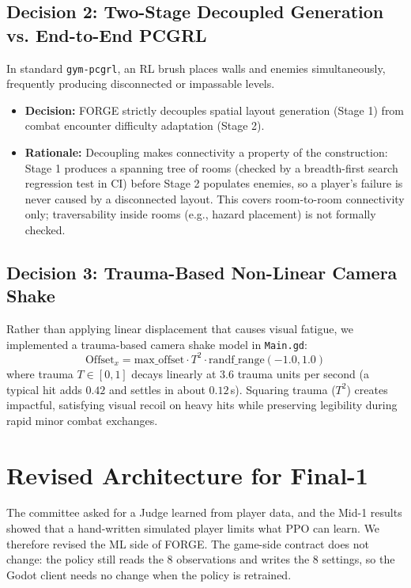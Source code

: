 \subsection{Decision 2: Two-Stage Decoupled Generation vs. End-to-End PCGRL}
In standard \texttt{gym-pcgrl}, an RL brush places walls and enemies simultaneously, frequently producing disconnected or impassable levels.
\begin{itemize}
    \item \textbf{Decision:} FORGE strictly decouples spatial layout generation (Stage 1) from combat encounter difficulty adaptation (Stage 2).
    \item \textbf{Rationale:} Decoupling makes connectivity a property of the construction: Stage 1 produces a spanning tree of rooms (checked by a breadth-first search regression test in CI) before Stage 2 populates enemies, so a player's failure is never caused by a disconnected layout. This covers room-to-room connectivity only; traversability inside rooms (e.g., hazard placement) is not formally checked.
\end{itemize}

\subsection{Decision 3: Trauma-Based Non-Linear Camera Shake}
Rather than applying linear displacement that causes visual fatigue, we implemented a trauma-based camera shake model in \texttt{Main.gd}:
\begin{equation}
\text{Offset}_x = \text{max\_offset} \cdot T^2 \cdot \text{randf\_range}(-1.0, 1.0)
\label{eq:trauma}
\end{equation}
where trauma $T \in [0, 1]$ decays linearly at $3.6$ trauma units per second (a typical hit adds $0.42$ and settles in about $0.12$\,s). Squaring trauma ($T^2$) creates impactful, satisfying visual recoil on heavy hits while preserving legibility during rapid minor combat exchanges.

\section{Revised Architecture for Final-1}
\label{sec:revised_arch}
The committee asked for a Judge learned from player data, and the Mid-1 results showed that a hand-written simulated player limits what PPO can learn. We therefore revised the ML side of FORGE. The game-side contract does not change: the policy still reads the 8 observations and writes the 8 settings, so the Godot client needs no change when the policy is retrained.

